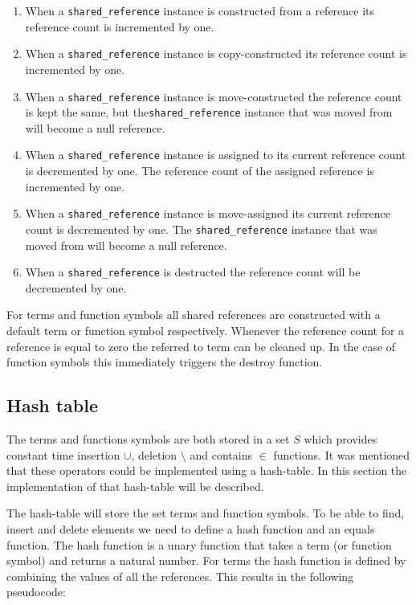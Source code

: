 \documentclass[10pt,a4paper]{article}
\begin{document}
\begin{enumerate}
  \item When a \texttt{shared\_reference} instance is constructed from a reference its reference count is incremented by one.
  
  \item When a \texttt{shared\_reference} instance is copy-constructed its reference count is incremented by one.
  
  \item When a \texttt{shared\_reference} instance is move-constructed the reference count is kept the same, but the\texttt{shared\_reference} instance that was moved from will become a null reference.
  
  \item When a \texttt{shared\_reference} instance is assigned to its current reference count is decremented by one.
  The reference count of the assigned reference is incremented by one.
  
  \item When a \texttt{shared\_reference} instance is move-assigned its current reference count is decremented by one. The \texttt{shared\_reference} instance that was moved from will become a null reference.
  
  \item When a \texttt{shared\_reference} is destructed the reference count will be decremented by one. 
\end{enumerate}

\noindent For terms and function symbols all shared references are constructed with a default term or function symbol respectively. 
Whenever the reference count for a reference is equal to zero the referred to term can be cleaned up.
In the case of function symbols this immediately triggers the destroy function.

\subsection{Hash table}

The terms and functions symbols are both stored in a set $S$ which provides constant time insertion $\cup$, deletion $\setminus$ and contains $\in$ functions.
It was mentioned that these operators could be implemented using a hash-table.
In this section the implementation of that hash-table will be described.

The hash-table will store the set terms and function symbols.
To be able to find, insert and delete elements we need to define a hash function and an equals function.
The hash function is a unary function that takes a term (or function symbol) and returns a natural number.
For terms the hash function is defined by combining the values of all the references.
This results in the following pseudocode:
\end{document}
